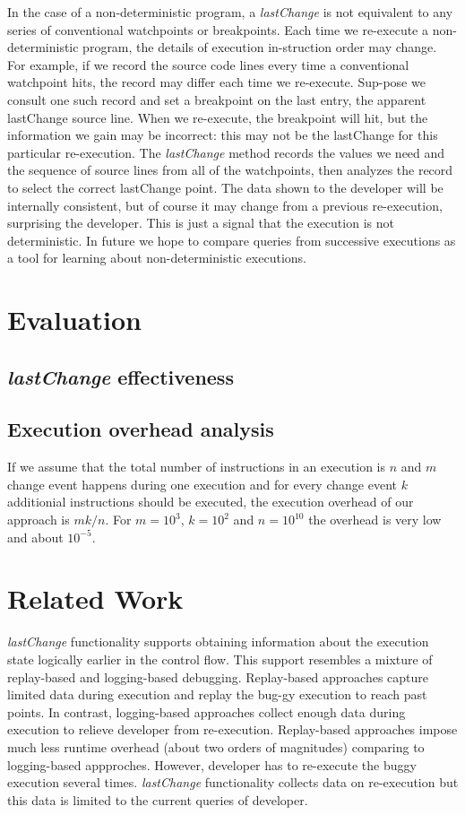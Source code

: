 \documentclass[preprint]{sigplanconf}
\begin{document}
In the case of a non-deterministic program, a \textit{lastChange} is not equivalent to any series of conventional watchpoints or breakpoints. Each time we re-execute a non-deterministic program, the details of execution in-struction order may change. For example, if we record the source code lines every time a conventional watchpoint hits, the record may differ each time we re-execute. Sup-pose we consult one such record and set a breakpoint on the last entry, the apparent lastChange source line. When we re-execute, the breakpoint will hit, but the information we gain may be incorrect: this may not be the lastChange for this particular re-execution. The \textit{lastChange} method records the values we need and the sequence of source lines from all of the watchpoints, then analyzes the record to select the correct lastChange point. The data shown to the developer will be internally consistent, but of course it may change from a previous re-execution, surprising the developer. This is just a signal that the execution is not deterministic. In future we hope to compare queries from successive executions as a tool for learning about non-deterministic executions.

\section{Evaluation}
\subsection{\textit{lastChange} effectiveness}

\subsection{Execution overhead analysis}
If we assume that the total number of instructions in an execution is $n$ and $m$ change event happens during one execution and for every change event $k$ additionial instructions should be executed, the execution overhead of our approach is $mk/n$. For $m=10^3$, $k=10^2$ and $n=10^{10}$ the overhead is very low and about $10^{-5}$.

\section{Related Work}

\textit{lastChange} functionality supports obtaining information about the execution state logically earlier in the control flow. This support resembles a mixture of replay-based and logging-based debugging. Replay-based approaches capture limited data during execution and replay the bug-gy execution to reach past points. In contrast, logging-based approaches collect enough data during execution to relieve developer from re-execution. Replay-based approaches impose much less runtime overhead (about two orders of magnitudes) comparing to logging-based appproches. However, developer has to re-execute the buggy execution several times. \textit{lastChange} functionality collects data on re-execution but this data is limited to the current queries of developer.
\end{document}
